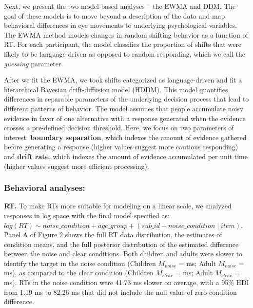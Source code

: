 \documentclass[10pt, letterpaper]{article}
\begin{document}
Next, we present the two model-based analyses -- the EWMA and DDM. The
goal of these models is to move beyond a description of the data and map
behavioral differences in eye movements to underlying psychological
variables. The EWMA method models changes in random shifting behavior as
a function of RT. For each participant, the model classifies the
proportion of shifts that were likely to be language-driven as opposed
to random responding, which we call the \emph{guessing} parameter.

After we fit the EWMA, we took shifts categorized as language-driven and
fit a hierarchical Bayesian drift-diffusion model (HDDM). This model
quantifies differences in separable parameters of the underlying
decision process that lead to different patterns of behavior. The model
assumes that people accumulate noisy evidence in favor of one
alternative with a response generated when the evidence crosses a
pre-defined decision threshold. Here, we focus on two parameters of
interest: \textbf{boundary separation}, which indexes the amount of
evidence gathered before generating a response (higher values suggest
more cautious responding) and \textbf{drift rate}, which indexes the
amount of evidence accumulated per unit time (higher values suggest more
efficient processing).

\subsubsection{Behavioral analyses:}\label{behavioral-analyses}

\textbf{RT.} To make RTs more suitable for modeling on a linear scale,
we analyzed responses in log space with the final model specified as:
\texttt{$log(RT) \sim noise\_condition + age\_group + (sub\_id + noise\_condition \mid item)$}.
Panel A of Figure 2 shows the full RT data distribution, the estimates
of condition means, and the full posterior distribution of the estimated
difference between the noise and clear conditions. Both children and
adults were slower to identify the target in the noise condition
(Children \(M_{noise}\) = ms; Adult \(M_{noise}\) = ms), as compared to
the clear condition (Children \(M_{clear}\) = ms; Adult \(M_{clear}\) =
ms). RTs in the noise condition were 41.73 ms slower on average, with a
95\% HDI from 1.19 ms to 82.26 ms that did not include the null value of
zero condition difference.
\end{document}
